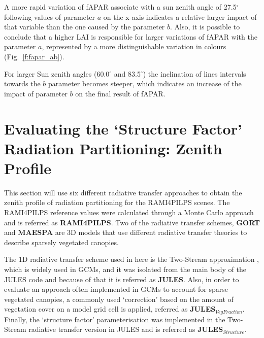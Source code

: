 \documentclass[a4paper,11pt]{report}
\begin{document}
A more rapid variation of fAPAR associate with a sun zenith angle of 27.5$^{\circ}$ following values of parameter $a$ on the x-axis indicates a relative larger impact of that variable than the one caused by the parameter $b$. Also, it is possible to conclude that a higher LAI is responsible for larger variations of fAPAR with the parameter $a$, represented by a more distinguishable variation in colours (Fig.~\ref{f:fapar_ab}). 

For larger Sun zenith angles (60.0$^{\circ}$ and 83.5$^{\circ}$) the inclination of lines intervals towards the $b$ parameter becomes steeper, which indicates an increase of the impact of parameter $b$ on the final result of fAPAR. 

\section{Evaluating the `Structure Factor' Radiation Partitioning: Zenith Profile}
This section will use six different radiative transfer approaches to obtain the zenith profile of radiation partitioning for the RAMI4PILPS scenes. The RAMI4PILPS reference values were calculated through a Monte Carlo approach and is referred as \textbf{RAMI4PILPS}. Two of the radiative transfer schemes, \textbf{GORT} \citep{Li1995,Ni1997} and \textbf{MAESPA} \citep{Wang1990,Medlyn2004,Medlyn2007} are 3D models that use different radiative transfer theories to describe sparsely vegetated canopies. 

The 1D radiative transfer scheme used in here is the Two-Stream approximation \citep{Sellers1985}, which is widely used in GCMs, and it was isolated from the main body of the JULES code \citep{Best2011,Clark2011} and because of that it is referred as \textbf{JULES}.
Also, in order to evaluate an approach often implemented in GCMs to account for sparse vegetated canopies, a commonly used `correction' based on the amount of vegetation cover on a model grid cell is applied, referred as \textbf{JULES$_{VegFraction}$}. 
Finally, the `structure factor' parameterisation \citep{pinty2006} was implemented in the Two-Stream radiative transfer version in JULES and is referred as \textbf{JULES$_{Structure}$}. 
\end{document}
